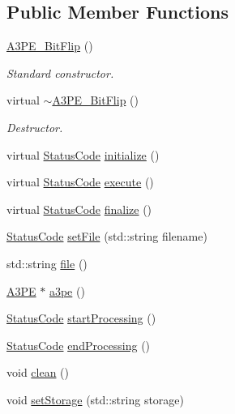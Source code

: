 \subsection*{Public Member Functions}
\begin{DoxyCompactItemize}
\item 
\hyperlink{classA3PE__BitFlip_a79aca0cefbd433bfb7f0e0cb6bc7abe1}{A3PE\_\-BitFlip} ()
\begin{DoxyCompactList}\small\item\em Standard constructor. \item\end{DoxyCompactList}\item 
virtual \hyperlink{classA3PE__BitFlip_ab58f69a2c8d342bcad937b1dbc0bb3ed}{$\sim$A3PE\_\-BitFlip} ()
\begin{DoxyCompactList}\small\item\em Destructor. \item\end{DoxyCompactList}\item 
virtual \hyperlink{classStatusCode}{StatusCode} \hyperlink{classA3PE__BitFlip_a88dc6cfe690a518e38ff6d89026e6e0c}{initialize} ()
\item 
virtual \hyperlink{classStatusCode}{StatusCode} \hyperlink{classA3PE__BitFlip_affa7320fb39001a6e9b5696542fe4584}{execute} ()
\item 
virtual \hyperlink{classStatusCode}{StatusCode} \hyperlink{classA3PE__BitFlip_ab40772a001613a0e1932d1e356ccf717}{finalize} ()
\item 
\hyperlink{classStatusCode}{StatusCode} \hyperlink{classA3PE__BitFlip_a079d34acd89f699395a9bbf6b4918205}{setFile} (std::string filename)
\item 
std::string \hyperlink{classA3PE__BitFlip_ace874c555080ce6cb68b6bf320977a5a}{file} ()
\item 
\hyperlink{classA3PE}{A3PE} $\ast$ \hyperlink{classA3PE__BitFlip_ac0d0747dfdd99084dd5524fea62f11d6}{a3pe} ()
\item 
\hyperlink{classStatusCode}{StatusCode} \hyperlink{classProcessus_a09319bde9bed93e290f69b4e04585543}{startProcessing} ()
\item 
\hyperlink{classStatusCode}{StatusCode} \hyperlink{classProcessus_a5e4da662989d356b89d490b89c7afbfd}{endProcessing} ()
\item 
void \hyperlink{classProcessus_aaeb17673b98d2b39f3aa780e335e0968}{clean} ()
\item 
void \hyperlink{classProcessus_ad57a29b33f9021eda9f6929136f1784f}{setStorage} (std::string storage)

\end{DoxyCompactItemize}
